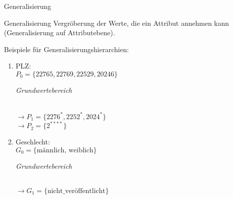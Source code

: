 \begin{frame}{Generalisierung}
	\begin{block} {Generalisierung}
		Vergröberung der Werte, die ein Attribut annehmen kann (Generalisierung auf Attributebene).	
	\end{block}
	
	\vspace{0.5cm}
	
	Beispiele für Generalisierungshierarchien: 
	\begin{enumerate}
	\item PLZ: \\
		\hspace{0.4cm} \(P_0 = \{22765, 22769, 22529, 20246\}\) \begin{small}\textit{Grundwertebereich}\end{small} \\
		\(\rightarrow P_1 = \{2276^*, 2252^*, 2024^*\}\)\\
		\(\rightarrow P_2 = \{2^{****}\}\)\\
	\item Geschlecht: \\
		\hspace{0.4cm} \(G_0 = \{\text{männlich, weiblich}\}\) \begin{small}\textit{Grundwertebereich}\end{small} \\
		\(\rightarrow G_1 = \{\text{nicht\_veröffentlicht}\}\)
	\end{enumerate}
\end{frame}


